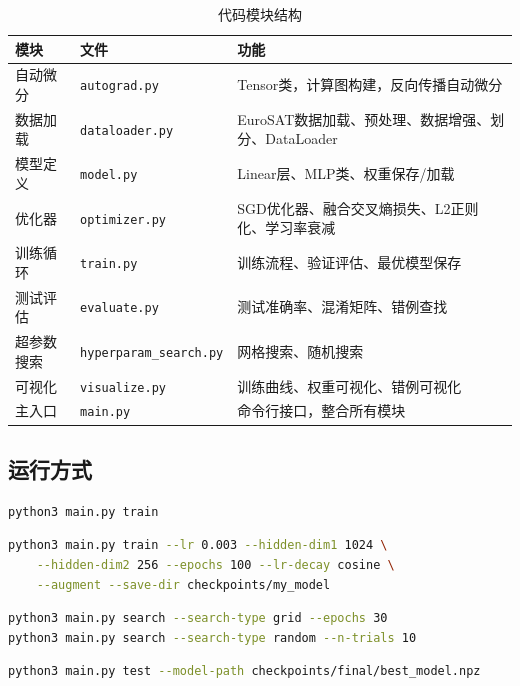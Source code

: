 \documentclass[12pt,a4paper]{article}
\begin{document}
\begin{table}[H]
\centering
\caption{代码模块结构}
\label{tab:code_structure}
\begin{tabular}{llp{8cm}}
\toprule
\textbf{模块} & \textbf{文件} & \textbf{功能} \\
\midrule
自动微分 & \texttt{autograd.py} & Tensor类，计算图构建，反向传播自动微分 \\
数据加载 & \texttt{dataloader.py} & EuroSAT数据加载、预处理、数据增强、划分、DataLoader \\
模型定义 & \texttt{model.py} & Linear层、MLP类、权重保存/加载 \\
优化器 & \texttt{optimizer.py} & SGD优化器、融合交叉熵损失、L2正则化、学习率衰减 \\
训练循环 & \texttt{train.py} & 训练流程、验证评估、最优模型保存 \\
测试评估 & \texttt{evaluate.py} & 测试准确率、混淆矩阵、错例查找 \\
超参数搜索 & \texttt{hyperparam\_search.py} & 网格搜索、随机搜索 \\
可视化 & \texttt{visualize.py} & 训练曲线、权重可视化、错例可视化 \\
主入口 & \texttt{main.py} & 命令行接口，整合所有模块 \\
\bottomrule
\end{tabular}
\end{table}

\subsection{运行方式}

\begin{lstlisting}[language=bash, caption=训练模型（使用最优默认参数）]
python3 main.py train
\end{lstlisting}

\begin{lstlisting}[language=bash, caption=自定义参数训练]
python3 main.py train --lr 0.003 --hidden-dim1 1024 \
    --hidden-dim2 256 --epochs 100 --lr-decay cosine \
    --augment --save-dir checkpoints/my_model
\end{lstlisting}

\begin{lstlisting}[language=bash, caption=超参数搜索]
python3 main.py search --search-type grid --epochs 30
python3 main.py search --search-type random --n-trials 10
\end{lstlisting}

\begin{lstlisting}[language=bash, caption=测试模型]
python3 main.py test --model-path checkpoints/final/best_model.npz
\end{lstlisting}
\end{document}
